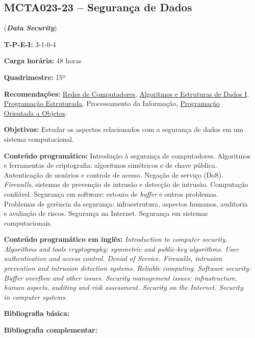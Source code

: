 \documentclass[12pt,a4paper]{article}
\begin{document}
\subsection*{MCTA023-23 -- Segurança de Dados}
\label{disc:seg}

(\textbf{\textit{Data Security}})

\begin{center}
    \begin{minipage}{0.85\textwidth}
    
        \textbf{T-P-E-I:} 3-1-0-4
        
        \textbf{Carga horária:} 48 horas
        
        \textbf{Quadrimestre:} 15º
        
        \textbf{Recomendações:} 
        \hyperref[disc:redes]{Redes de Computadores},
        \hyperref[disc:aedI]{Algoritmos e Estruturas de Dados I},
        \hyperref[disc:pe]{Programação Estruturada},
        Processamento da Informação,
        \hyperref[disc:poo]{Programação Orientada a Objetos}.
        
    \end{minipage}
\end{center}

\textbf{Objetivos:}
Estudar os aspectos relacionados com a segurança de dados em um sistema
computacional.

\textbf{Conteúdo programático:}
Introdução à segurança de computadores.
Algoritmos e ferramentas de criptografia: algoritmos simétricos e de chave pública.
Autenticação de usuários e controle de acesso.
Negação de serviço (DoS).
\textit{Firewalls}, sistemas de prevenção de intrusão e detecção de intrusão.
Computação confiável.
Segurança em software: estouro de \textit{buffer} e outros problemas.
Problemas de gerência da segurança: infraestrutura, aspectos humanos, auditoria
e avaliação de riscos. 
Segurança na Internet. Segurança em sistemas computacionais.

\textbf{Conteúdo programático em inglês:}
\textit{Introduction to computer security. 
Algorithms and tools cryptography: symmetric and public-key algorithms. 
User authentication and access control.
Denial of Service. 
Firewalls, intrusion prevention and intrusion detection systems. 
Reliable computing. 
Software security: Buffer overflow and other issues. 
Security management issues: infrastructure, human aspects, auditing and risk assessment. 
Security on the Internet. Security in computer systems.}

\newrefsection
\textbf{Bibliografia básica:}
\nocite{2013-goodrich-tamassia, 2008-stallings, 2007-nakamura-geus} 
\printbibliography

\newrefsection
\textbf{Bibliografia complementar:}
\nocite{2007-konheim, 1996-schneier, 2011-stamp, 2017-correia-sousa, 2005-cheswick-etal}
\printbibliography
\end{document}
